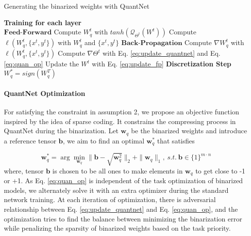 \documentclass[runningheads]{llncs}
\begin{document}
\begin{algorithm}[t] \label{alg:op}
  \caption{Generating the binarized weights with QuantNet}
  \textbf{Training for each layer}\\
  {
    $\textbf{Feed-Forward}$\;
    \quad Compute $W^t_q$ with $tanh(\mathcal{Q}_{\Theta^t}(W^t))$\;
    \quad Compute $\ell(W^t_q, \{x^t,y^t\})$ with $W^t_q$ and $\{x^t, y^t\}$\;
    $\textbf{Back-Propagation}$\;
    \quad Compute $\nabla W^t_q$ with $\ell(W^t_q, \{x^t, y^t\})$\;
    \quad Compute $\nabla \Theta^t$ with Eq. \ref{eq:update_quantnet} and Eq. \ref{eq:quan_op}\;
    \quad Update the $W^t$ with Eq. \ref{eq:update_fp}\;
}
  \textbf{Discretization Step}\\
  $W^*_q = sign(W^T_q)$\;
\end{algorithm}

\paragraph{\textbf{QuantNet Optimization}}
For satisfying the constraint in assumption 2, we propose an objective function inspired by the idea of sparse coding.
It constrains the compressing process in QuantNet during the binarization.
Let $\textbf{w}_q$ be the binarized weights and introduce a reference tensor $\textbf{b}$,
we aim to find an optimal $\textbf{w}^*_q$ that satisfies

\begin{equation}\label{eq:quan_op}
\textbf{w}^*_q = \arg \min \limits_{\textbf{w}_q} \| \textbf{b} - \sqrt{\textbf{w}^2_q} \|_2
+ \| \textbf{w}_q \|_1, \ s.t. \ \textbf{b} \in \{1\}^{m \cdot n}
\end{equation}
where, tensor $\textbf{b}$ is chosen to be all ones to make elements in $\textbf{w}_q$ to get close to -1 or +1.
As Eq. \ref{eq:quan_op} is independent of the task optimization of binarized models,
we alternately solve it with an extra optimizer during the standard network training.
At each iteration of optimization, there is adversarial relationship
between Eq. \ref{eq:update_quantnet} and Eq. \ref{eq:quan_op},
and the optimization tries to find the balance between minimizing the binarization error
while penalizing the sparsity of binarized weights based on the task priority.
\end{document}
